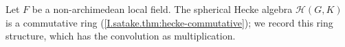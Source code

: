 Let $F$ be a non-archimedean local field. The spherical Hecke algebra $\mathcal H(G,K)$ is a commutative ring (\cref{I.satake.thm:hecke-commutative}); we record this ring structure, which has the convolution as multiplication.
